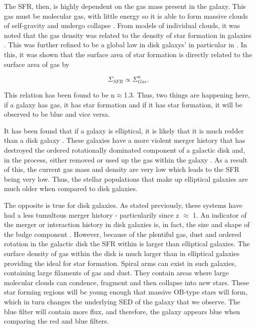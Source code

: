 The SFR, then, is highly dependent on the gas mass present in the galaxy. This gas must be molecular gas, with little energy so it is able to form massive clouds of self-gravity and undergo collapse \citep{1965MNRAS.130...97G, 1972ApJ...176L...9Q}. From models of individual clouds, it was noted that the gas density was related to the density of star formation in galaxies \citep{1959ApJ...129..243S}. This was further refined to be a global law in disk galaxys' in particular in \citet{1998ApJ...498..541K}. In this, it was shown that the surface area of star formation is directly related to the surface area of gas by 

\begin{equation}\label{eq:ks-law}
	\Sigma_{SFR} \propto \Sigma_{Gas}^{n}. 
\end{equation}

\noindent This relation has been found to be n$\approx$1.3. Thus, two things are happening here, if a galaxy has gas, it has star formation and if it has star formation, it will be observed to be blue and vice versa.

It has been found that if a galaxy is elliptical, it is likely that it is much redder than a disk galaxy \citep{1992MNRAS.254..589B}. These galaxies have a more violent merger history that has destroyed the ordered rotationally dominated component of a galactic disk and, in the process, either removed or used up the gas within the galaxy \citep{1976ApJ...204..365F}. As a result of this, the current gas mass and density are very low which leads to the SFR being very low. Thus, the stellar populations that make up elliptical galaxies are much older when compared to disk galaxies.

The opposite is true for disk galaxies. As stated previously, these systems have had a less tumultous merger history - particularily since z $\approx$ 1. An indicator of the merger or interaction history in disk galaxies is, in fact, the size and shape of the bulge component \citep{2011MNRAS.414..888E}. However, because of the plentiful gas, dust and ordered rotation in the galactic disk the SFR within is larger than elliptical galaxies. The surface density of gas within the disk is much larger than in elliptical galaxies providing the ideal for star formation. Spiral arms can exist in such galaxies, containing large filaments of gas and dust. They contain areas where large molecular clouds can condence, fragment and then collapse into new stars. These star forming regions will be young enough that massive OB-type stars will form, which in turn changes the underlying SED of the galaxy that we observe. The blue filter will contain more flux, and therefore, the galaxy appears blue when comparing the red and blue filters.

